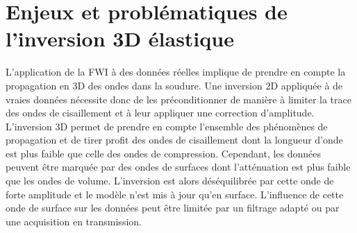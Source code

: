 





\section{Enjeux et problématiques de l'inversion 3D élastique}

L'application de la FWI à des données réelles implique de prendre en compte la propagation en 3D des ondes dans la soudure. Une inversion 2D appliquée à de vraies données nécessite donc de les préconditionner de manière à limiter la trace des ondes de cisaillement et à leur appliquer une correction d'amplitude. \\

L'inversion 3D permet de prendre en compte l'ensemble des phénomènes de propagation et de tirer profit des ondes de cisaillement dont la longueur d'onde est plus faible que celle des ondes de compression. Cependant, les données peuvent être marquée par des ondes de surfaces dont l'atténuation est plus faible que les ondes de volume.  L'inversion est alors déséquilibrée par cette onde de forte amplitude et le modèle n'est mis à jour qu'en surface. L'influence de cette onde de surface sur les données peut être limitée par un filtrage adapté ou par une acquisition en transmission.\\ 

